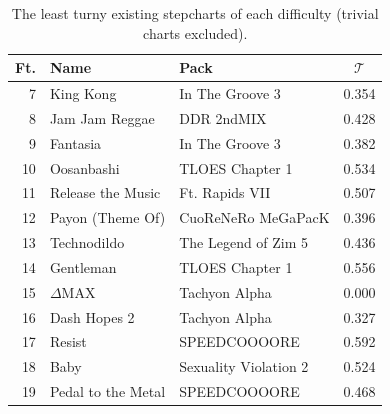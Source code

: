 \documentclass[10pt]{sigplanconf}
\begin{document}
\begin{table}[t]
	\begin{center}
		\small
	\begin{tabular}{r|l|l|c}
		Ft. & Name & Pack & $\mathcal{T}$ \\
		\hline
		7  & King Kong & In The Groove 3 & 0.354 \\
		8  & Jam Jam Reggae & DDR 2ndMIX & 0.428 \\
		9  & Fantasia & In The Groove 3 & 0.382 \\
		10 & Oosanbashi & TLOES Chapter 1 & 0.534 \\
		11 & Release the Music & Ft. Rapids VII & 0.507 \\
		12 & Payon (Theme Of) & CuoReNeRo MeGaPacK & 0.396 \\
		13 & Technodildo & The Legend of Zim 5 & 0.436 \\
		14 & Gentleman & TLOES Chapter 1 & 0.556 \\
		15 & $\Delta$MAX & Tachyon Alpha & 0.000 \\
		16 & Dash Hopes 2 & Tachyon Alpha & 0.327 \\
		17 & Resist & SPEEDCOOOORE & 0.592\\
		18 & Baby & Sexuality Violation 2 & 0.524 \\
		19 & Pedal to the Metal & SPEEDCOOOORE & 0.468 \\
	\end{tabular}
	\end{center}
	\caption{The least turny existing stepcharts of each difficulty (trivial charts excluded).}
	\label{tab:feets2}
\end{table}
\end{document}
